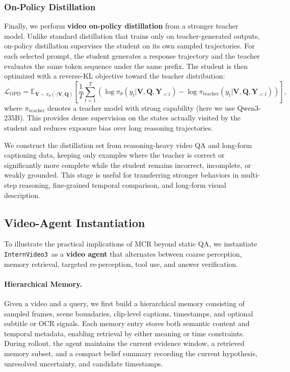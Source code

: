 \documentclass[11pt, letterpaper]{template}
\theoremstyle{plain}
\theoremstyle{definition}
\theoremstyle{remark}
\newcommand{\name}{\texttt{InternVideo3}\xspace}
\begin{document}
\subsubsection{On-Policy Distillation}

Finally, we perform \textbf{video on-policy distillation} from a stronger teacher model. Unlike standard distillation that trains only on teacher-generated outputs, on-policy distillation supervises the student on its own sampled trajectories. For each selected prompt, the student generates a response trajectory and the teacher evaluates the same token sequence under the same prefix. The student is then optimized with a reverse-KL objective toward the teacher distribution:
\begin{equation}
\mathcal{L}_{\text{OPD}} =
\mathbb{E}_{\mathbf{Y}\sim\pi_\theta(\cdot|\mathbf{V},\mathbf{Q})}
\left[
\frac{1}{T}\sum_{t=1}^{T}
\left(
\log \pi_\theta(y_t|\mathbf{V},\mathbf{Q},\mathbf{Y}_{<t})
-
\log \pi_{\text{teacher}}(y_t|\mathbf{V},\mathbf{Q},\mathbf{Y}_{<t})
\right)
\right],
\end{equation}
where $\pi_{\text{teacher}}$ denotes a teacher model with strong capability (here we use Qwen3-235B). 
This provides dense supervision on the states actually visited by the student and reduces exposure bias over long reasoning trajectories.

We construct the distillation set from reasoning-heavy video QA and long-form captioning data, keeping only examples where the teacher is correct or significantly more complete while the student remains incorrect, incomplete, or weakly grounded. This stage is useful for transferring stronger behaviors in multi-step reasoning, fine-grained temporal comparison, and long-form visual description.

\subsection{Video-Agent Instantiation}

To illustrate the practical implications of MCR beyond static QA, we instantiate \name\ as a \textbf{video agent} that alternates between coarse perception, memory retrieval, targeted re-perception, tool use, and answer verification.

\paragraph{Hierarchical Memory.}
Given a video and a query, we first build a hierarchical memory consisting of sampled frames, scene boundaries, clip-level captions, timestamps, and optional subtitle or OCR signals. Each memory entry stores both semantic content and temporal metadata, enabling retrieval by either meaning or time constraints. During rollout, the agent maintains the current evidence window, a retrieved memory subset, and a compact belief summary recording the current hypothesis, unresolved uncertainty, and candidate timestamps.
\end{document}
